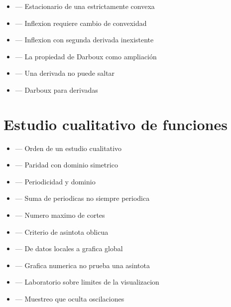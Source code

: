 \documentclass[10pt,a4paper,oneside,openany]{book}
\begin{document}
\begin{itemize}
\item {} — Estacionario de una estrictamente convexa
\item {} — Inflexion requiere cambio de convexidad
\item {} — Inflexion con segunda derivada inexistente
\item {} — La propiedad de Darboux como ampliación
\item {} — Una derivada no puede saltar
\item {} — Darboux para derivadas
\end{itemize}
\section*{Estudio cualitativo de funciones}
\begin{itemize}
\item {} — Orden de un estudio cualitativo
\item {} — Paridad con dominio simetrico
\item {} — Periodicidad y dominio
\item {} — Suma de periodicas no siempre periodica
\item {} — Numero maximo de cortes
\item {} — Criterio de asintota oblicua
\item {} — De datos locales a grafica global
\item {} — Grafica numerica no prueba una asintota
\item {} — Laboratorio sobre limites de la visualizacion
\item {} — Muestreo que oculta oscilaciones
\end{itemize}
\end{document}
